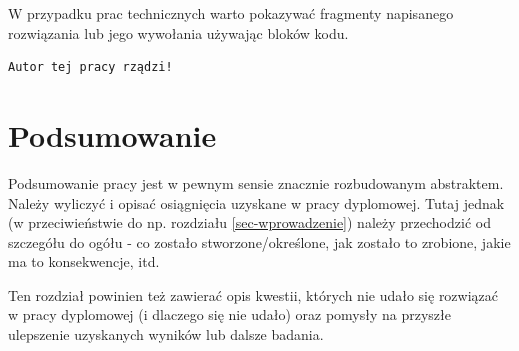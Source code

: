 \documentclass{amuthesis}
\begin{document}
W przypadku prac technicznych warto pokazywać fragmenty napisanego
rozwiązania lub jego wywołania używając bloków kodu.

\begin{Shaded}
\begin{Highlighting}[]
\OtherTok{=} 
  \NormalTok{)}
\NormalTok{\}}
\NormalTok{(}\NormalTok{)}
\end{Highlighting}
\end{Shaded}

\begin{verbatim}
Autor tej pracy rządzi!
\end{verbatim}


\hypertarget{podsumowanie}{%
\chapter{Podsumowanie}\label{podsumowanie}}

Podsumowanie pracy jest w pewnym sensie znacznie rozbudowanym
abstraktem. Należy wyliczyć i opisać osiągnięcia uzyskane w pracy
dyplomowej. Tutaj jednak (w przeciwieństwie do np. rozdziału
\ref{sec-wprowadzenie}) należy przechodzić od szczegółu do ogółu - co
zostało stworzone/określone, jak zostało to zrobione, jakie ma to
konsekwencje, itd.

Ten rozdział powinien też zawierać opis kwestii, których nie udało się
rozwiązać w pracy dyplomowej (i dlaczego się nie udało) oraz pomysły na
przyszłe ulepszenie uzyskanych wyników lub dalsze badania.

\printbibliography[heading=bibintoc, title=Bibliografia]
\end{document}

